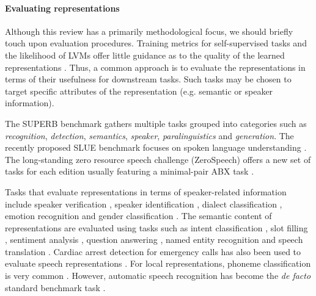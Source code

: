 \paragraph{Evaluating representations} 
Although this review has a primarily methodological focus, we should briefly touch upon evaluation procedures.
Training metrics for self-supervised tasks and the likelihood of LVMs offer little guidance as to the quality of the learned representations \cite{huszar_is_2017}. Thus, a common approach is to evaluate the representations in terms of their usefulness for downstream tasks. Such tasks may be chosen to target specific attributes of the representation (e.g. semantic or speaker information).

The SUPERB benchmark \cite{yang2021superb} gathers multiple tasks grouped into categories such as \emph{recognition}, \emph{detection}, \emph{semantics}, \emph{speaker}, \emph{paralinguistics} and \emph{generation}. 
The recently proposed SLUE benchmark focuses on spoken language understanding \cite{shon2021slue}.
The long-standing zero resource speech challenge (ZeroSpeech) offers a new set of tasks for each edition \cite{versteegh2015zero, dunbar2017zero, dunbar2019zero, dunbar2020zero, dunbar2021zero} usually featuring a minimal-pair ABX task \cite{schatz2013evaluating, schatz2014evaluating}. 
 
Tasks that evaluate representations in terms of speaker-related information include speaker verification \cite{hsu_unsupervised_2017, khurana_factorial_2019, milde2018unspeech}, speaker identification \cite{oord2018representation, jati2019neural, chung2019unsupervised, liu2020non}, dialect classification \cite{khurana_factorial_2019}, emotion recognition \cite{Pascual2019, yang2021superb} and gender classification \cite{lee_unsupervised_2009}. The semantic content of representations are evaluated using tasks such as intent classification \cite{morais2021end, yang2021superb}, slot filling \cite{lai2021semi, yang2021superb}, sentiment analysis \cite{liu2020mockingjay}, question answering \cite{chung2020splat}, named entity recognition \cite{shon2021slue, borgholt2021we, pasad2021use} and speech translation \cite{bansal2017towards, chung2020generative}. Cardiac arrest detection for emergency calls has also been used to evaluate speech representations \cite{borgholt2021we}.
For local representations, phoneme classification is very common \cite{lee_unsupervised_2009, hsu_learning_2017, chorowski_unsupervised_2019, chung2019unsupervised, liu2021tera}.
However, automatic speech recognition has become the \textit{de facto} standard benchmark task \cite{ling2020decoar, chung2020generative, hsu2021hubert}.


